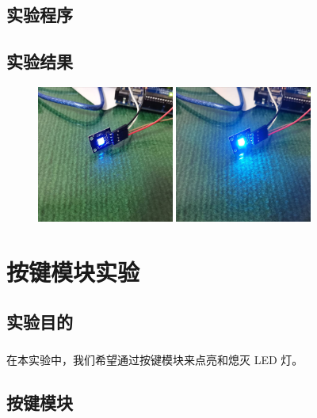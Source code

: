 \documentclass[UTF8, oneside]{ctexbook}
\begin{document}
\section{实验程序}


\section{实验结果}
\begin{figure}[h]
    \centering
    \includegraphics[width=0.4\textwidth]{./result/basic/3/result1.jpg}
    \includegraphics[width=0.4\textwidth]{./result/basic/3/result2.jpg}
\end{figure}

\chapter{按键模块实验}
\section{实验目的}
\paragraph{}
在本实验中，我们希望通过按键模块来点亮和熄灭 LED 灯。

\section{按键模块}
\end{document}
